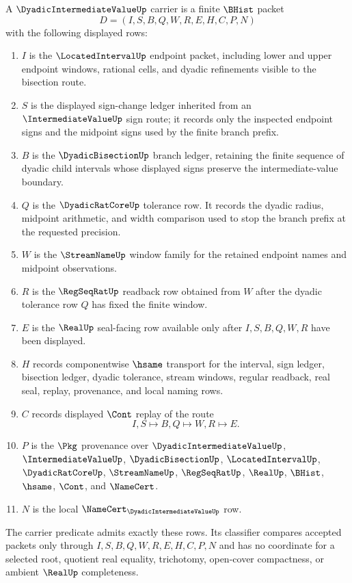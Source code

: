 \begin{definition}
\label{def:dyadic-intermediate-value-carrier}
A $\DyadicIntermediateValueUp$ carrier is a finite $\BHist$ packet
$$
D=(I,S,B,Q,W,R,E,H,C,P,N)
$$
with the following displayed rows:
\begin{enumerate}
\item $I$ is the $\LocatedIntervalUp$ endpoint packet, including lower and upper endpoint windows, rational cells, and dyadic refinements visible to the bisection route.
\item $S$ is the displayed sign-change ledger inherited from an $\IntermediateValueUp$ sign route; it records only the inspected endpoint signs and the midpoint signs used by the finite branch prefix.
\item $B$ is the $\DyadicBisectionUp$ branch ledger, retaining the finite sequence of dyadic child intervals whose displayed signs preserve the intermediate-value boundary.
\item $Q$ is the $\DyadicRatCoreUp$ tolerance row. It records the dyadic radius, midpoint arithmetic, and width comparison used to stop the branch prefix at the requested precision.
\item $W$ is the $\StreamNameUp$ window family for the retained endpoint names and midpoint observations.
\item $R$ is the $\RegSeqRatUp$ readback row obtained from $W$ after the dyadic tolerance row $Q$ has fixed the finite window.
\item $E$ is the $\RealUp$ seal-facing row available only after $I,S,B,Q,W,R$ have been displayed.
\item $H$ records componentwise $\hsame$ transport for the interval, sign ledger, bisection ledger, dyadic tolerance, stream windows, regular readback, real seal, replay, provenance, and local naming rows.
\item $C$ records displayed $\Cont$ replay of the route
$$
I,S \longmapsto B,Q \longmapsto W,R \longmapsto E .
$$
\item $P$ is the $\Pkg$ provenance over $\DyadicIntermediateValueUp$, $\IntermediateValueUp$, $\DyadicBisectionUp$, $\LocatedIntervalUp$, $\DyadicRatCoreUp$, $\StreamNameUp$, $\RegSeqRatUp$, $\RealUp$, $\BHist$, $\hsame$, $\Cont$, and $\NameCert$.
\item $N$ is the local $\NameCert_{\DyadicIntermediateValueUp}$ row.
\end{enumerate}
The carrier predicate admits exactly these rows. Its classifier compares accepted packets only through $I,S,B,Q,W,R,E,H,C,P,N$ and has no coordinate for a selected root, quotient real equality, trichotomy, open-cover compactness, or ambient $\RealUp$ completeness.
\end{definition}


